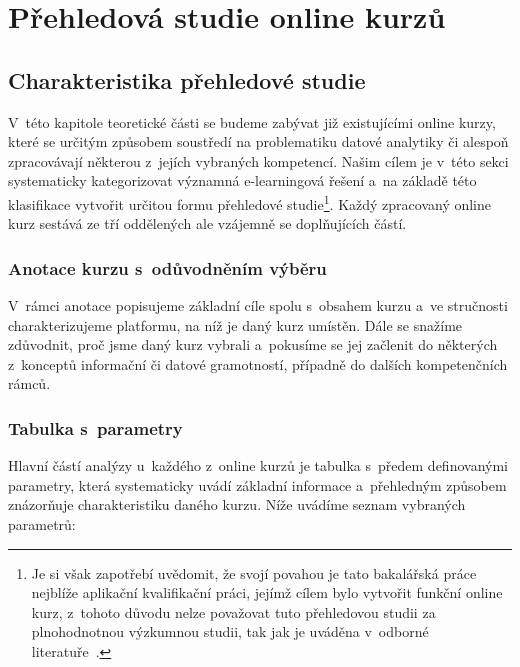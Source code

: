 \hypertarget{pux159ehledovuxe1-studie-online-kurzux16f}{%
\chapter{Přehledová studie online kurzů}\label{pux159ehledovuxe1-studie-online-kurzux16f}}

\hypertarget{charakteristika-pux159ehledovuxe9-studie}{%
\section{Charakteristika přehledové studie}\label{charakteristika-pux159ehledovuxe9-studie}}

V~této kapitole teoretické části se budeme zabývat již existujícími online kurzy, které se určitým způsobem soustředí na problematiku datové analytiky či alespoň zpracovávají některou z~jejích vybraných kompetencí. Našim cílem je v~této sekci systematicky kategorizovat významná e-learningová řešení a~na základě této klasifikace vytvořit určitou formu přehledové studie\footnote{Je si však zapotřebí uvědomit, že svojí povahou je tato bakalářská práce nejblíže aplikační kvalifikační práci, jejímž cílem bylo vytvořit funkční online kurz, z~tohoto důvodu nelze považovat tuto přehledovou studii za plnohodnotnou výzkumnou studii, tak jak je uváděna v~odborné literatuře~\parencite{mares2013}.}. Každý zpracovaný online kurz sestává ze tří oddělených ale vzájemně se doplňujících částí.

\hypertarget{anotace-kurzu-s-odux16fvodnux11bnuxedm-vuxfdbux11bru}{%
\subsection{Anotace kurzu s~odůvodněním výběru}\label{anotace-kurzu-s-odux16fvodnux11bnuxedm-vuxfdbux11bru}}

V~rámci anotace popisujeme základní cíle spolu s~obsahem kurzu a~ve stručnosti charakterizujeme platformu, na níž je daný kurz umístěn. Dále se snažíme zdůvodnit, proč jsme daný kurz vybrali a~pokusíme se jej začlenit do některých z~konceptů informační či datové gramotností, případně do dalších kompetenčních rámců.

\hypertarget{tabulka-s-parametry}{%
\subsection{Tabulka s~parametry}\label{tabulka-s-parametry}}

Hlavní částí analýzy u~každého z~online kurzů je tabulka s~předem definovanými parametry, která systematicky uvádí základní informace a~přehledným způsobem znázorňuje charakteristiku daného kurzu. Níže uvádíme seznam vybraných parametrů:

